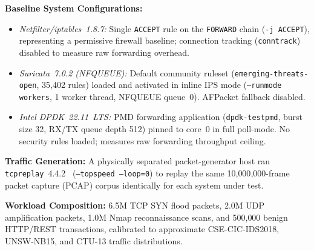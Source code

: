 \documentclass{ieeeaccess}
\renewcommand{\_}{\textunderscore\allowbreak}
\begin{document}
\textbf{Baseline System Configurations:}
\begin{itemize}
  \item \textit{Netfilter/iptables~1.8.7:} Single \texttt{ACCEPT} rule on the \texttt{FORWARD} chain (\texttt{-j ACCEPT}), representing a permissive firewall baseline; connection tracking (\texttt{conntrack}) disabled to measure raw forwarding overhead.
  \item \textit{Suricata~7.0.2 (NFQUEUE):} Default community ruleset (\texttt{emerging-threats-open}, 35{,}402 rules) loaded and activated in inline IPS mode (\texttt{--runmode workers}, 1 worker thread, NFQUEUE queue~0). AFPacket fallback disabled.
  \item \textit{Intel DPDK~22.11~LTS:} PMD forwarding application (\texttt{dpdk-testpmd}, burst size 32, RX/TX queue depth 512) pinned to core~0 in full poll-mode. No security rules loaded; measures raw forwarding throughput ceiling.
\end{itemize}

\textbf{Traffic Generation:} A physically separated packet-generator host ran \texttt{tcpreplay}~4.4.2~\cite{tcpreplay2024} (\texttt{--topspeed --loop=0}) to replay the same 10{,}000{,}000-frame packet capture (PCAP) corpus identically for each system under test.

\textbf{Workload Composition:} 6.5M TCP SYN flood packets, 2.0M UDP
amplification packets, 1.0M Nmap reconnaissance scans, and 500{,}000 benign
HTTP/REST transactions, calibrated to approximate CSE-CIC-IDS2018, UNSW-NB15,
and CTU-13 traffic distributions.
\end{document}
